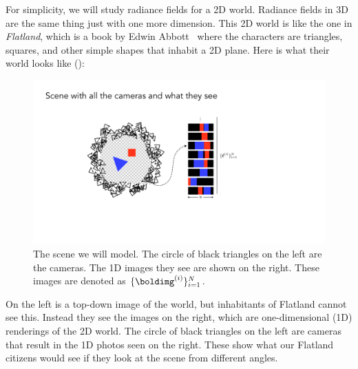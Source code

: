 For simplicity, we will study radiance fields for a 2D world. Radiance fields in 3D are the same thing just with one more dimension. 
This 2D world is like the one in \textit{Flatland}, which is a book by Edwin Abbott~\cite{abbott2009flatland} where the characters are triangles, squares, and other simple shapes that inhabit a 2D plane. %
Here is what their world looks like (\fig{\ref{fig:nerfs:flatland_cameras_and_images}}):
\begin{figure}[h!]
    \centerline{
    \includegraphics[width=0.65\linewidth]{figures/nerfs/flatland_cameras_and_images.pdf}
    }
    \caption{The scene we will model. The circle of black triangles on the left are the cameras. The 1D images they see are shown on the right. These images are denoted as $\{\boldimg^{(i)}\}_{i=1}^N$.}
    \label{fig:nerfs:flatland_cameras_and_images}
\end{figure}

On the left is a top-down image of the world, but inhabitants of Flatland cannot see this. Instead they see the images on the right, 
which are one-dimensional (1D) renderings of the 2D world. The circle of black triangles on the left are cameras that result in the 1D photos seen on the right. These show what our Flatland citizens would see if they look at the scene from different angles.

